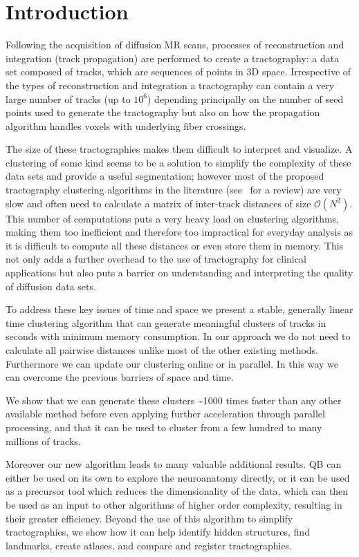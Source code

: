 \documentclass[preprint,authoryear,a4paper,10pt,onecolumn]{elsarticle}
\begin{document}
\section{Introduction}

Following the acquisition of diffusion MR scans, processes of
reconstruction and integration (track propagation) are performed to
create a tractography: a data set composed of tracks, which are
sequences of points in 3D space. Irrespective of the types of
reconstruction and integration a tractography can contain a very large
number of tracks (up to $10^6$) depending principally on the number of
seed points used to generate the tractography but also on how the
propagation algorithm handles voxels with underlying fiber crossings.

The size of these tractographies makes them difficult to interpret and
visualize. A clustering of some kind seems to be a solution to simplify
the complexity of these data sets and provide a useful segmentation;
however most of the proposed tractography clustering algorithms in the
literature (see~\citet{Garyfallidis_thesis} for a review) are very slow
and often need to calculate a matrix of inter-track distances of size
$\mathcal{O}(N^2)$. This number of computations puts a very heavy load
on clustering algorithms, making them too inefficient and therefore too
impractical for everyday analysis as it is difficult to compute all
these distances or even store them in memory. This not only adds a
further overhead to the use of tractography for clinical applications
but also puts a barrier on understanding and interpreting the quality of
diffusion data sets.

To address these key issues of time and space we present a stable,
generally linear time clustering algorithm that can generate meaningful
clusters of tracks in seconds with minimum memory consumption. In our
approach we do not need to calculate all pairwise distances unlike most
of the other existing methods. Furthermore we can update our clustering
online or in parallel. In this way we can overcome the previous barriers
of space and time.

We show that we can generate these clusters \textasciitilde1000 times faster than
any other available method before even applying further
acceleration through parallel processing, and that it can be used to
cluster from a few hundred to many millions of tracks.

Moreover our new algorithm leads to many valuable additional results. QB
can either be used on its own to explore the neuroanatomy directly, or
it can be used as a precursor tool which reduces the dimensionality of
the data, which can then be used as an input to other algorithms of
higher order complexity, resulting in their greater efficiency. Beyond
the use of this algorithm to simplify tractographies, we show how it can
help identify hidden structures, find landmarks, create atlases, and
compare and register tractographies.
\end{document}
